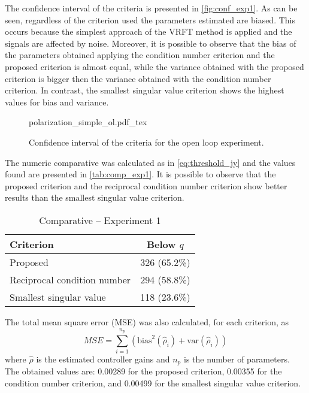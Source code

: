 The confidence interval of the criteria is presented in \autoref{fig:conf_exp1}.
As can be seen, regardless of the criterion used the parameters estimated are biased.
This occurs because the simplest approach of the VRFT method is applied and the signals are affected by noise.
Moreover, it is possible to observe that the bias of the parameters obtained applying the condition number criterion and the proposed criterion is almost equal, while the variance obtained with the proposed criterion is bigger then the variance obtained with the condition number criterion.
In contrast, the smallest singular value criterion shows the highest values for bias and variance.
\begin{figure}[h!]
  \centering
  \def\svgwidth{\columnwidth}
  {\footnotesize{polarization_simple_ol.pdf_tex}}
  \caption{\label{fig:conf_exp1} Confidence interval of the criteria for the open loop experiment.}
\end{figure}


The numeric comparative was calculated as in \eqref{eq:threshold_jy} and the values found are presented in \autoref{tab:comp_exp1}.
It is possible to observe that the proposed criterion and the reciprocal condition number criterion show better results than the smallest singular value criterion.
\begin{table}[h!]
  \caption{Comparative -- Experiment 1 \label{tab:comp_exp1}}
  \centering
  \begin{tabular}{lc}
  \toprule
  Criterion & Below $q$\\
  \midrule
  Proposed & 326 (65.2\%) \\
  Reciprocal condition number & 294 (58.8\%) \\
  Smallest singular value & 118 (23.6\%) \\
  \bottomrule
  \end{tabular}
\end{table}


The total mean square error (MSE) was also calculated, for each criterion, as
\begin{equation}
	MSE = \sum\limits_{i=1}^{n_p}\left( \text{bias}^2(\hat{\rho}_i) + \text{var}(\hat{\rho}_i) \right)
\label{eq:mse}
\end{equation}
where $\hat{\rho}$ is the estimated controller gains and $n_p$ is the number of parameters.
The obtained values are: 0.00289 for the proposed criterion, 0.00355 for the condition number criterion, and 0.00499 for the smallest singular value criterion.


